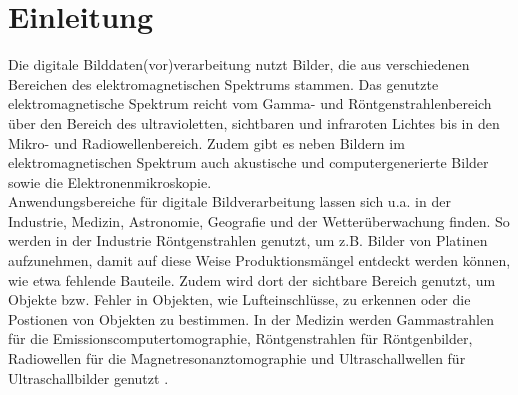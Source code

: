 \documentclass[ngerman,12pt]{article} %
\begin{document}
\section{Einleitung}
\label{sec:Einleitung}
Die digitale Bilddaten(vor)verarbeitung nutzt Bilder, die aus verschiedenen Bereichen des elektromagnetischen Spektrums stammen. Das genutzte elektromagnetische Spektrum reicht vom Gamma- und Röntgenstrahlenbereich über den Bereich des ultravioletten, sichtbaren und infraroten Lichtes bis in den Mikro- und Radiowellenbereich. Zudem gibt es neben Bildern im elektromagnetischen Spektrum auch akustische und computergenerierte Bilder sowie die Elektronenmikroskopie.\\
Anwendungsbereiche für digitale Bildverarbeitung lassen sich u.a. in der Industrie, Medizin, Astronomie, Geografie und der Wetterüberwachung finden. So werden in der Industrie Röntgenstrahlen genutzt, um z.B. Bilder von Platinen aufzunehmen, damit auf diese Weise Produktionsmängel entdeckt werden können, wie etwa fehlende Bauteile. Zudem wird dort der sichtbare Bereich genutzt, um Objekte bzw. Fehler in Objekten, wie Lufteinschlüsse, zu erkennen oder die Postionen von Objekten zu bestimmen. In der Medizin werden Gammastrahlen für die Emissionscomputertomographie, Röntgenstrahlen für Röntgenbilder, Radiowellen für die Magnetresonanztomographie und Ultraschallwellen für Ultraschallbilder genutzt \cite{Gonzalez}.\newline
\end{document}
